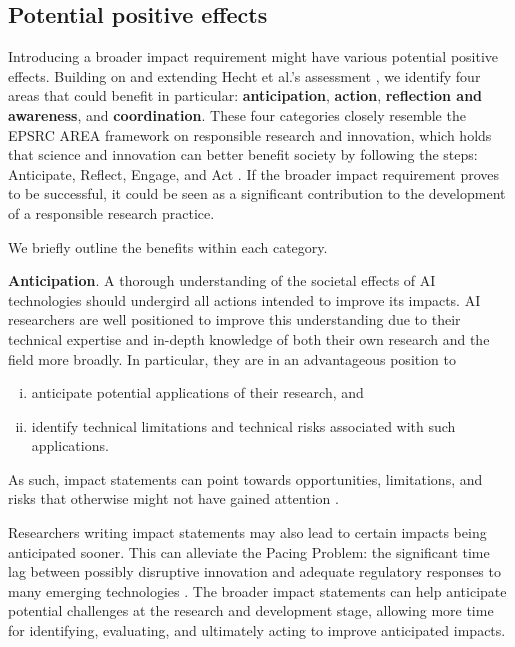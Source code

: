 \documentclass[11pt,english]{article}
\begin{document}
	\subsection*{Potential positive effects}
	
	Introducing a broader impact requirement might have various potential positive effects. Building on and extending Hecht et al.'s assessment \citep{hecht_its_2018}, we identify four areas that could benefit in particular: \textbf{anticipation}, \textbf{action}, \textbf{reflection and awareness}, and \textbf{coordination}. These four categories closely resemble the EPSRC AREA framework on responsible research and innovation, which holds that science and innovation can better benefit society by following the steps: Anticipate, Reflect, Engage, and Act \citep{epsrc_anticipate_2020,owen_responsible_2012}. If the broader impact requirement proves to be successful, it could be seen as a significant contribution to the development of a responsible research practice. 
	
	We briefly outline the benefits within each category. 
	
	\textbf{Anticipation}. A thorough understanding of the societal effects of AI technologies should undergird all actions intended to improve its impacts. %
	AI researchers are well positioned to improve this understanding due to their technical expertise and in-depth knowledge of both their own research and the field more broadly. In particular, they are in an advantageous position to 
	
	\begin{enumerate}[(i)]
		\item anticipate potential applications of their research, and
		\item identify technical limitations and technical risks associated with such applications. 
	\end{enumerate}
	
	As such, impact statements can point towards opportunities, limitations, and risks that otherwise might not have gained attention \citep{stilgoe_developing_2013}. 
	
	Researchers writing impact statements may also lead to certain impacts being anticipated sooner. This can alleviate the Pacing Problem: the significant time lag between possibly disruptive innovation and adequate regulatory responses to many emerging technologies \citep{marchant_growing_2011,owen_responsible_2010}. The broader impact statements can help anticipate potential challenges at the research and development stage, allowing more time for identifying, evaluating, and ultimately acting to improve anticipated impacts. 
	
\end{document}
